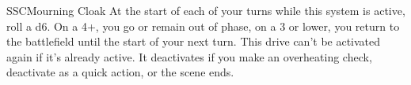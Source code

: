 \begin{mech}{SSC}{Mourning Cloak}
At the start of each of your turns while this system is active, roll a d6. On a 4+, you go or remain out of phase, on a 3 or lower, you return to the battlefield until the start of your next turn. This drive can't be activated again if it's already active. It deactivates if you make an overheating check, deactivate as a quick action, or the scene ends.
\end{mech}